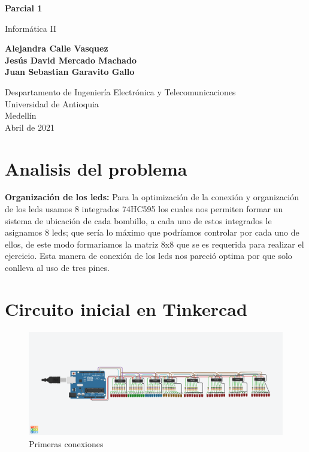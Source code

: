 \documentclass{article}
\begin{document}
\begin{titlepage}
    \begin{center}
        \vspace*{1cm}
            
        \Huge
        \textbf{Parcial 1}
            
        \vspace{0.5cm}
        \LARGE
        Informática II
            
        \vspace{2.5cm}
            
        \textbf{Alejandra Calle Vasquez\\
                Jesús David Mercado Machado \\
                Juan Sebastian Garavito Gallo}
            
        \vfill
            
        \vspace{0.7cm}
            
        \Large
        Despartamento de Ingeniería Electrónica y Telecomunicaciones\\
        Universidad de Antioquia\\
        Medellín\\
        Abril de 2021
            
    \end{center}
\end{titlepage}

\tableofcontents
\newpage
\section{Analisis del problema}\label{intro}
\textbf{Organización de los leds: }
Para la optimización de la conexión y organización de los leds usamos 8 integrados 74HC595 los cuales nos permiten formar un sistema de ubicación de cada bombillo, a cada uno de estos integrados le asignamos 8 leds; que sería lo máximo que podríamos controlar por cada uno de ellos, de este modo formariamos la matriz 8x8 que se es requerida para realizar el ejercicio. Esta manera de conexión de los leds nos pareció optima por que solo conlleva al uso de tres pines.

\section{Circuito inicial en Tinkercad} \label{imagenes}

\begin{figure}[h]
\includegraphics[width=15cm]{PARCIAL INFO 2.png}
\centering
\caption{Primeras conexiones}
\label{fig:PARCIAL INFO 2}
\end{figure}
\end{document}
